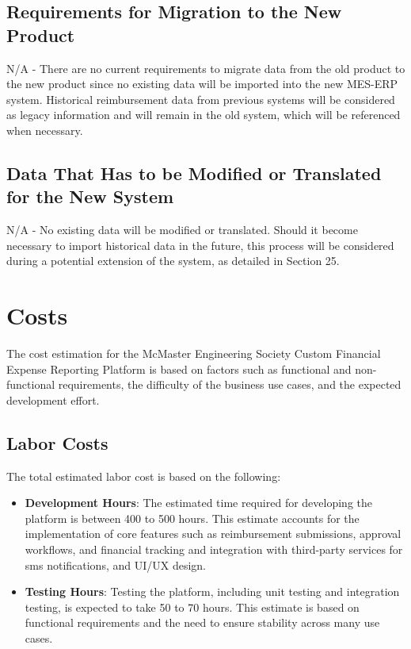 \documentclass[12pt]{article}
\begin{document}
\subsection{Requirements for Migration to the New Product}
N/A - There are no current requirements to migrate data from the old product to the new product since no existing data will be imported into the new MES-ERP system. Historical reimbursement data from previous systems will be considered as legacy information and will remain in the old system, which will be referenced when necessary.

\subsection{Data That Has to be Modified or Translated for the New System}
N/A - No existing data will be modified or translated. Should it become necessary to import historical data in the future, this process will be considered during a potential extension of the system, as detailed in Section 25.

\section{Costs}

The cost estimation for the McMaster Engineering Society Custom Financial Expense Reporting Platform is based on factors such as functional and non-functional requirements, the difficulty of the business use cases, and the expected development effort.

\subsection{Labor Costs}
The total estimated labor cost is based on the following:
\begin{itemize}
    \item \textbf{Development Hours}: The estimated time required for developing the platform is between 400 to 500 hours. This estimate accounts for the implementation of core features such as reimbursement submissions, approval workflows, and financial tracking and integration with third-party services for sms notifications, and UI/UX design.
    \item \textbf{Testing Hours}: Testing the platform, including unit testing and integration testing, is expected to take 50 to 70 hours. This estimate is based on functional requirements and the need to ensure stability across many use cases.
\end{itemize}
\end{document}
